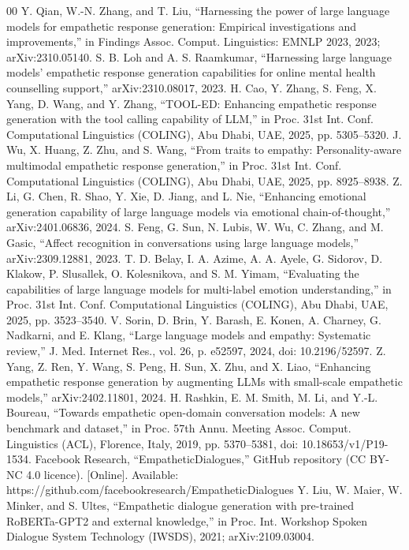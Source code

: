 \documentclass[conference]{IEEEtran}
\begin{document}
\begin{thebibliography}{00}
 Y. Qian, W.-N. Zhang, and T. Liu, ``Harnessing the power of large language models for empathetic response generation: Empirical investigations and improvements,'' in Findings Assoc. Comput. Linguistics: EMNLP 2023, 2023; arXiv:2310.05140.
 S. B. Loh and A. S. Raamkumar, ``Harnessing large language models' empathetic response generation capabilities for online mental health counselling support,'' arXiv:2310.08017, 2023.
 H. Cao, Y. Zhang, S. Feng, X. Yang, D. Wang, and Y. Zhang, ``TOOL-ED: Enhancing empathetic response generation with the tool calling capability of LLM,'' in Proc. 31st Int. Conf. Computational Linguistics (COLING), Abu Dhabi, UAE, 2025, pp. 5305--5320.
 J. Wu, X. Huang, Z. Zhu, and S. Wang, ``From traits to empathy: Personality-aware multimodal empathetic response generation,'' in Proc. 31st Int. Conf. Computational Linguistics (COLING), Abu Dhabi, UAE, 2025, pp. 8925--8938.
 Z. Li, G. Chen, R. Shao, Y. Xie, D. Jiang, and L. Nie, ``Enhancing emotional generation capability of large language models via emotional chain-of-thought,'' arXiv:2401.06836, 2024.
 S. Feng, G. Sun, N. Lubis, W. Wu, C. Zhang, and M. Gasic, ``Affect recognition in conversations using large language models,'' arXiv:2309.12881, 2023.
 T. D. Belay, I. A. Azime, A. A. Ayele, G. Sidorov, D. Klakow, P. Slusallek, O. Kolesnikova, and S. M. Yimam, ``Evaluating the capabilities of large language models for multi-label emotion understanding,'' in Proc. 31st Int. Conf. Computational Linguistics (COLING), Abu Dhabi, UAE, 2025, pp. 3523--3540.
 V. Sorin, D. Brin, Y. Barash, E. Konen, A. Charney, G. Nadkarni, and E. Klang, ``Large language models and empathy: Systematic review,'' J. Med. Internet Res., vol. 26, p. e52597, 2024, doi: 10.2196/52597.
 Z. Yang, Z. Ren, Y. Wang, S. Peng, H. Sun, X. Zhu, and X. Liao, ``Enhancing empathetic response generation by augmenting LLMs with small-scale empathetic models,'' arXiv:2402.11801, 2024.
 H. Rashkin, E. M. Smith, M. Li, and Y.-L. Boureau, ``Towards empathetic open-domain conversation models: A new benchmark and dataset,'' in Proc. 57th Annu. Meeting Assoc. Comput. Linguistics (ACL), Florence, Italy, 2019, pp. 5370--5381, doi: 10.18653/v1/P19-1534.
 Facebook Research, ``EmpatheticDialogues,'' GitHub repository (CC BY-NC 4.0 licence). [Online]. Available: https://github.com/facebookresearch/EmpatheticDialogues
 Y. Liu, W. Maier, W. Minker, and S. Ultes, ``Empathetic dialogue generation with pre-trained RoBERTa-GPT2 and external knowledge,'' in Proc. Int. Workshop Spoken Dialogue System Technology (IWSDS), 2021; arXiv:2109.03004.

\end{thebibliography}
\end{document}

